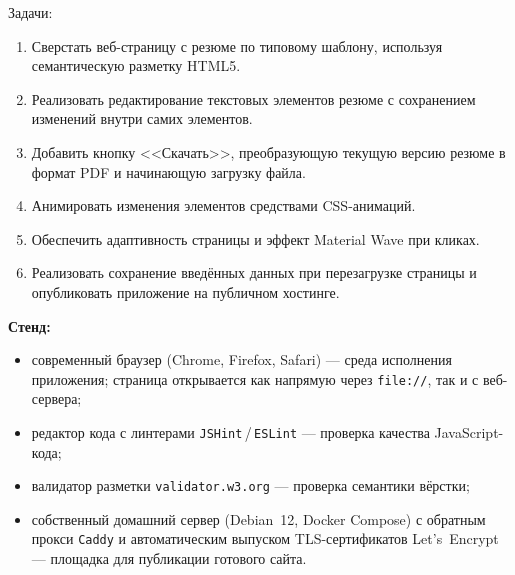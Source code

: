 Задачи:
\begin{enumerate}
  \item Сверстать веб-страницу с резюме по типовому шаблону, используя
        семантическую разметку HTML5.
  \item Реализовать редактирование текстовых элементов резюме с сохранением
        изменений внутри самих элементов.
  \item Добавить кнопку <<Скачать>>, преобразующую текущую версию резюме в
        формат PDF и начинающую загрузку файла.
  \item Анимировать изменения элементов средствами CSS-анимаций.
  \item Обеспечить адаптивность страницы и эффект Material Wave при кликах.
  \item Реализовать сохранение введённых данных при перезагрузке страницы и
        опубликовать приложение на публичном хостинге.
\end{enumerate}

\textbf{Стенд:}
\begin{itemize}
  \item современный браузер (Chrome, Firefox, Safari) --- среда исполнения
        приложения; страница открывается как напрямую через \texttt{file://},
        так и с веб-сервера;
  \item редактор кода с линтерами \texttt{JSHint}\,/\,\texttt{ESLint} ---
        проверка качества JavaScript-кода;
  \item валидатор разметки \texttt{validator.w3.org} --- проверка семантики
        вёрстки;
  \item собственный домашний сервер (Debian~12, Docker Compose) с обратным
        прокси \texttt{Caddy} и автоматическим выпуском TLS-сертификатов
        Let's~Encrypt --- площадка для публикации готового сайта.
\end{itemize}

\endinput
